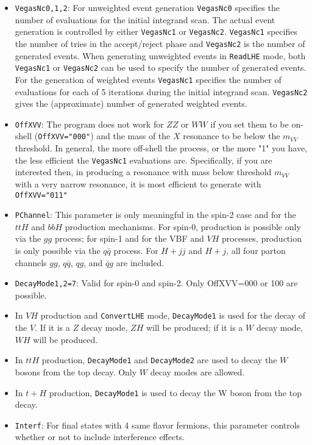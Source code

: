 \documentclass[aps,superscriptaddress,nofootinbib]{revtex4}
\begin{document}
\begin{itemize}
\item {\verb|VegasNc0,1,2|}: For unweighted event generation \verb|VegasNc0| specifies the number of evaluations for the initial integrand scan.  The actual event generation is controlled by either \verb|VegasNc1| or \verb|VegasNc2|. \verb|VegasNc1| specifies the number of tries in the accept/reject phase and \verb|VegasNc2| is the number of generated events. When generating unweighted events in \verb|ReadLHE| mode, both \verb|VegasNc1| or \verb|VegasNc2| can be used to specify the number of generated events. For the generation of weighted events \verb|VegasNc1| specifies the number of evaluations for each of 5 iterations during the initial integrand scan. \verb|VegasNc2| gives the (approximate) number of generated weighted events.
\item {\verb|OffXVV|}: The program does not work for $ZZ$ or $WW$ if you set them to be on-shell (\verb|OffXVV="000"|) and the mass of the $X$ resonance to be below the $m_{VV}$ threshold.  In general, the more off-shell the process, or the more "1" you have, the less efficient the \verb|VegasNc1| evaluations are.  Specifically, if you are interested then, in producing a resonance with mass below threshold $m_{VV}$ with a very narrow resonance, it is most efficient to generate with \verb|OffXVV="011"|
\item \verb|PChannel|: This parameter is only meaningful in the spin-2 case and for the $ttH$ and $bbH$ production mechanisms.  For spin-0, production is possible only via the $gg$ process; for spin-1 and for the VBF and $VH$ processes, production is only possible via the $q\bar{q}$ process.  For $H+jj$ and $H+j$, all four parton channels $gg$, $q\bar{q}$, $qg$, and $\bar{q}g$ are included.
\item \verb|DecayMode1,2=7|: Valid for spin-0 and spin-2.  Only OffXVV=000 or 100 are possible.
\item In $VH$ production and \verb|ConvertLHE| mode, \verb|DecayMode1| is used for the decay of the $V$.  If it is a $Z$ decay mode, $ZH$ will be produced; if it is a $W$ decay mode, $WH$ will be produced.
\item In $ttH$ production, \verb|DecayMode1| and \verb|DecayMode2| are used to decay the $W$ bosons from the top decay.  Only $W$ decay modes are allowed.
\item In $t+H$ production, \verb|DecayMode1| is used to decay the W boson from the top decay.
\item \verb|Interf|: For final states with 4 same flavor fermions, this parameter controls whether or not to include interference effects.

\end{itemize}
\end{document}
